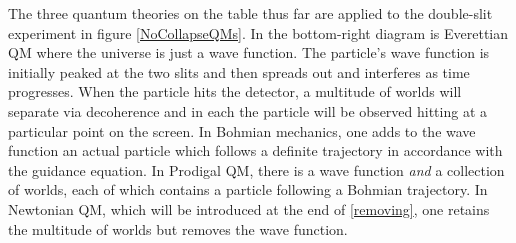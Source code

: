 \documentclass[12pt,secnumarabic,balancelastpage,amsmath,amssymb,nofootinbib]{article}
\begin{document}
The three quantum theories on the table thus far are applied to the double-slit experiment in figure \ref{NoCollapseQMs}.  In the bottom-right diagram is Everettian QM where the universe is just a wave function.  The particle's wave function is initially peaked at the two slits and then spreads out and interferes as time progresses.  When the particle hits the detector, a multitude of worlds will separate via decoherence and in each the particle will be observed hitting at a particular point on the screen.  In Bohmian mechanics, one adds to the wave function an actual particle which follows a definite trajectory in accordance with the guidance equation.  In Prodigal QM, there is a wave function \emph{and} a collection of worlds, each of which contains a particle following a Bohmian trajectory.  In Newtonian QM, which will be introduced at the end of \textsection \ref{removing}, one retains the multitude of worlds but removes the wave function.
\end{document}
